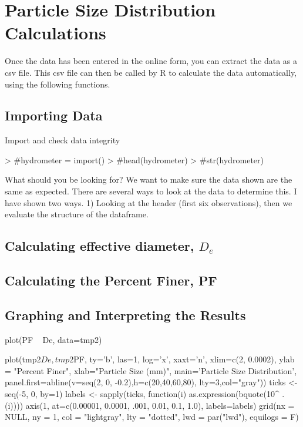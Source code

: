 \documentclass{tufte-handout}
\begin{document}
\section{Particle Size Distribution Calculations}

Once the data has been entered in the online form, you can extract the data as a csv file. This csv file can then be called by R to calculate the data automatically, using the following functions. 

\subsection{Importing Data}

Import and check data integrity

\begin{Schunk}
\begin{Sinput}
> #hydrometer = import()
> #head(hydrometer)
> #str(hydrometer)
\end{Sinput}
\end{Schunk}

What should you be looking for?  We want to make sure the data shown are the same as expected. There are several ways to look at the data to determine this. I have shown two ways. 1) Looking at the header (first six observations), then we evaluate the structure of the dataframe.
 
\subsection{Calculating effective diameter, $D_e$}


\subsection{Calculating the Percent Finer, PF}

\subsection{Graphing and Interpreting the Results}


plot(PF ~ De, data=tmp2)

plot(tmp2$De, tmp2$PF, ty='b', las=1, log='x', xaxt='n', xlim=c(2, 0.0002), ylab = "Percent Finer", xlab="Particle Size (mm)", main='Particle Size Distribution', panel.first=abline(v=seq(2, 0, -0.2),h=c(20,40,60,80), lty=3,col="gray"))
ticks <- seq(-5, 0, by=1)
labels <- sapply(ticks, function(i) as.expression(bquote(10^ .(i))))
axis(1, at=c(0.00001, 0.0001, .001, 0.01, 0.1, 1.0), labels=labels)
grid(nx = NULL, ny = 1, col = "lightgray", lty = "dotted",
     lwd = par("lwd"), equilogs = F)
\end{document}
